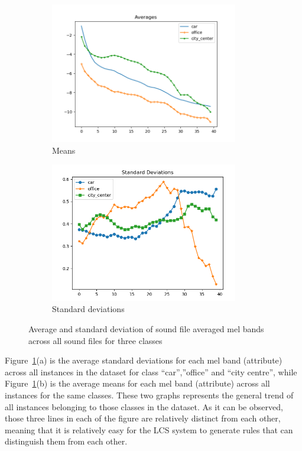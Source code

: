 \documentclass[11pt]{article}
\begin{document}
\begin{figure}[!htbp]
	\centering
	\begin{subfigure}[t]{0.48\textwidth}
		\centering
		\includegraphics[width=0.9\textwidth]{yiyang_figures/Figure_1.png}
		\caption{Means}
	\end{subfigure}
	\begin{subfigure}[t]{0.48\textwidth}
		\centering
		\includegraphics[width=0.9\textwidth]{yiyang_figures/3_class_std.png}
		\caption{Standard deviations}
	\end{subfigure}
	\caption{Average and standard deviation of sound file averaged mel bands across all sound files for three classes}
	\label{fig:avgAndStd3}
\end{figure}

Figure~\ref{fig:avgAndStd3}(a) is the average standard deviations for each mel band (attribute) across all instances in the dataset for class ``car'',''office'' and ``city centre'', while Figure~\ref{fig:avgAndStd3}(b) is the average means for each mel band (attribute) across all instances for the same classes.  These two graphs represents the general trend of all instances belonging to those classes in the dataset.  As it can be observed, those three lines  in each of the figure are relatively distinct from each other, meaning that it is relatively easy for the LCS system to generate rules that can distinguish them from each other. 
\end{document}
